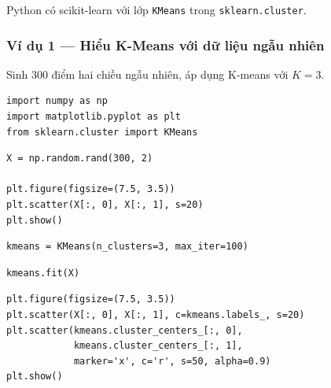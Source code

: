 \begin{phuongphap}[title={scikit-learn}]
Python có scikit-learn với lớp \texttt{KMeans} trong \texttt{sklearn.cluster}.
\end{phuongphap}

\subsubsection{Ví dụ 1 --- Hiểu K-Means với dữ liệu ngẫu nhiên}

\begin{dongco}[title={Bối cảnh}]
Sinh 300 điểm hai chiều ngẫu nhiên, áp dụng K-means với $K=3$.
\end{dongco}

\begin{vidu}[title={Bước 1 --- Import}]
\begin{lstlisting}
import numpy as np
import matplotlib.pyplot as plt
from sklearn.cluster import KMeans
\end{lstlisting}
\end{vidu}

\begin{vidu}[title={Bước 2 --- Sinh và vẽ dữ liệu}]
\begin{lstlisting}
X = np.random.rand(300, 2)

plt.figure(figsize=(7.5, 3.5))
plt.scatter(X[:, 0], X[:, 1], s=20)
plt.show()
\end{lstlisting}
\end{vidu}

\begin{ynghia}[title={Dữ liệu ban đầu}]
\end{ynghia}

\begin{vidu}[title={Bước 3 --- Khởi tạo K-Means}]
\begin{lstlisting}
kmeans = KMeans(n_clusters=3, max_iter=100)
\end{lstlisting}
\end{vidu}

\begin{vidu}[title={Bước 4 --- Huấn luyện}]
\begin{lstlisting}
kmeans.fit(X)
\end{lstlisting}
\end{vidu}

\begin{vidu}[title={Bước 5 --- Vẽ cụm và centroid}]
\begin{lstlisting}
plt.figure(figsize=(7.5, 3.5))
plt.scatter(X[:, 0], X[:, 1], c=kmeans.labels_, s=20)
plt.scatter(kmeans.cluster_centers_[:, 0],
            kmeans.cluster_centers_[:, 1],
            marker='x', c='r', s=50, alpha=0.9)
plt.show()
\end{lstlisting}
\end{vidu}

